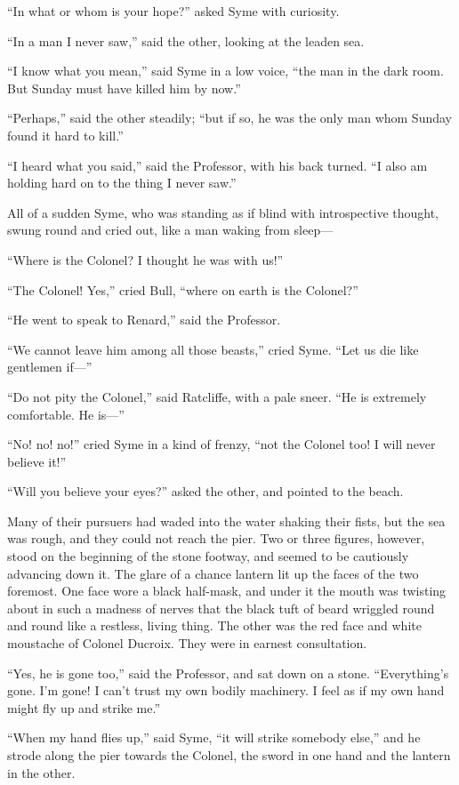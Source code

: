 \documentclass{book}
\begin{document}
“In what or whom is your hope?” asked Syme with curiosity.

“In a man I never saw,” said the other, looking at the leaden sea.

“I know what you mean,” said Syme in a low voice, “the man in the dark room. But Sunday must have killed him by now.”

“Perhaps,” said the other steadily; “but if so, he was the only man whom Sunday found it hard to kill.”

“I heard what you said,” said the Professor, with his back turned. “I also am holding hard on to the thing I never saw.”

All of a sudden Syme, who was standing as if blind with introspective thought, swung round and cried out, like a man waking from sleep—

“Where is the Colonel? I thought he was with us!”

“The Colonel! Yes,” cried Bull, “where on earth is the Colonel?”

“He went to speak to Renard,” said the Professor.

“We cannot leave him among all those beasts,” cried Syme. “Let us die like gentlemen if—”

“Do not pity the Colonel,” said Ratcliffe, with a pale sneer. “He is extremely comfortable. He is—”

“No! no! no!” cried Syme in a kind of frenzy, “not the Colonel too! I will never believe it!”

“Will you believe your eyes?” asked the other, and pointed to the beach.

Many of their pursuers had waded into the water shaking their fists, but the sea was rough, and they could not reach the pier. Two or three figures, however, stood on the beginning of the stone footway, and seemed to be cautiously advancing down it. The glare of a chance lantern lit up the faces of the two foremost. One face wore a black half-mask, and under it the mouth was twisting about in such a madness of nerves that the black tuft of beard wriggled round and round like a restless, living thing. The other was the red face and white moustache of Colonel Ducroix. They were in earnest consultation.

“Yes, he is gone too,” said the Professor, and sat down on a stone. “Everything’s gone. I’m gone! I can’t trust my own bodily machinery. I feel as if my own hand might fly up and strike me.”

“When my hand flies up,” said Syme, “it will strike somebody else,” and he strode along the pier towards the Colonel, the sword in one hand and the lantern in the other.
\end{document}
